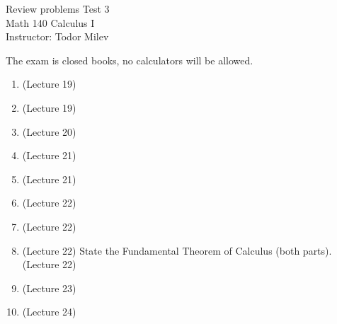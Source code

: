 \documentclass{article}
\begin{document}
\begin{center}
\Large
Review problems Test 3\\ Math 140 Calculus I \\ \normalsize Instructor: Todor Milev
\end{center}


\noindent The exam is closed books, no calculators will be allowed.

\begin{enumerate}
\item (Lecture 19) 
\item (Lecture 19) 
\item (Lecture 20) 
\item (Lecture 21) 
\item (Lecture 21) 
\item (Lecture 22) 
\item (Lecture 22) 

\item (Lecture 22) State the Fundamental Theorem of Calculus (both parts). (Lecture 22)

\item (Lecture 23) 

\item (Lecture 24)



\end{enumerate}











\end{document}
